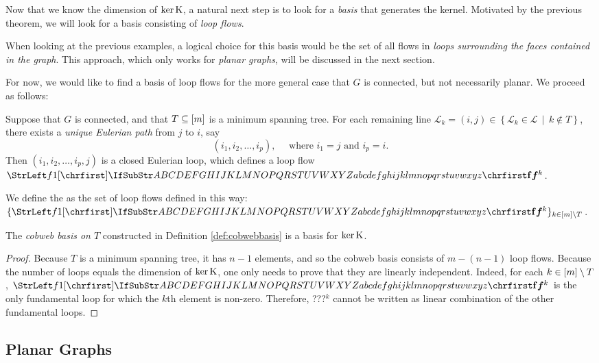 \documentclass[main.tex]{subfiles}
\begin{document}
Now that we know the dimension of $\ker \text{\textup{K}}$, a natural next step is to look for a \emph{basis} that generates the kernel. Motivated by the previous theorem, we will look for a basis consisting of \emph{loop flows}.

When looking at the previous examples, a logical choice for this basis would be the set of all flows in \emph{loops surrounding the faces contained in the graph}. This approach, which only works for \emph{planar graphs}, will be discussed in the next section.

For now, we would like to find a basis of loop flows for the more general case that $G$ is connected, but not necessarily planar. We proceed as follows:

\begin{definition}\label{def:cobwebbasis}
Suppose that $G$ is connected, and that $T \subseteq [m]$ is a minimum spanning tree. For each remaining line $\mathcal{L}_k = (i,j) \in \left\lbrace \mathcal{L}_k \in \mathcal{L} \, \mid \, k \notin  T \right\rbrace $, there exists a \emph{unique Eulerian path} from $j$ to $i$, say 
\[
(i_1, i_2, \dots, i_p),\quad\text{ where $i_1=j$ and $i_p=i$.}
\]
Then $(i_1, i_2, \dots, i_p, j)$ is a closed Eulerian loop, which defines a loop flow $\mat{f}^k$.

We define the  as the set of loop flows defined in this way: $\{ \mat{f}^k \}_{k \in \range{m} \setminus T}$.
\end{definition}

\begin{theorem}
The \emph{cobweb basis on $T$} constructed in Definition \ref{def:cobwebbasis} is a basis for $\ker \text{\textup{K}}$.
\end{theorem}
\begin{proof}
Because $T$ is a minimum spanning tree, it has $n-1$ elements, and so the cobweb basis consists of $m - (n-1)$ loop flows.
Because the number of loops equals the dimension of $\ker \text{\textup{K}}$, one only needs to prove that they are linearly independent. Indeed, for each $k \in [m]\setminus T$, $\mat{f}^k$ is the only fundamental loop for which the $k$th element is non-zero. Therefore, ???$^k$ cannot be written as linear combination of the other fundamental loops.
\end{proof}





\subsection{Planar Graphs}
\end{document}
